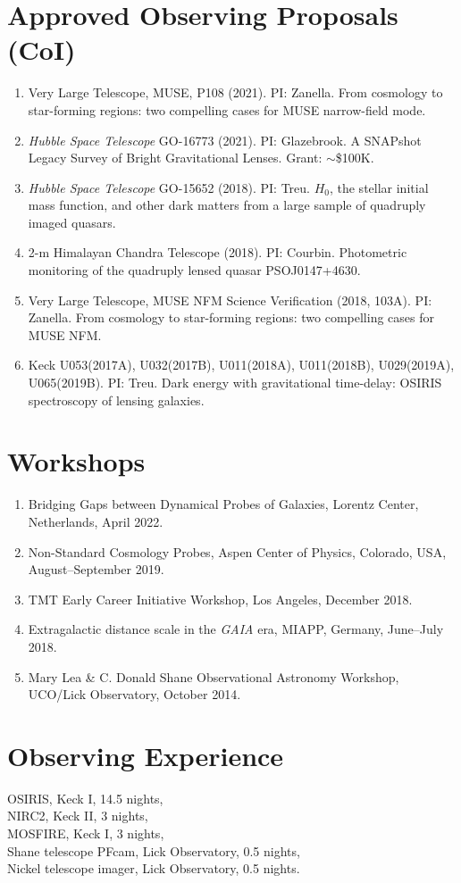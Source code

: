 \documentclass[margin, line]{res}
\begin{document}
\begin{resume}
\section{\sc Approved Observing Proposals (CoI)}
\begin{enumerate}
\item Very Large Telescope, MUSE, P108 (2021). PI: Zanella. From cosmology to star-forming regions: two compelling cases for MUSE narrow-field mode.
\item \textit{Hubble Space Telescope} GO-16773 (2021). PI: Glazebrook. A SNAPshot Legacy Survey of Bright Gravitational Lenses. Grant: $\sim$\$100K.
\item \textit{Hubble Space Telescope} GO-15652 (2018). PI: Treu. $H_0$, the stellar initial mass function, and other dark matters from a large sample of quadruply imaged quasars.
\item 2-m Himalayan Chandra Telescope (2018). PI: Courbin. Photometric monitoring of the quadruply lensed quasar PSOJ0147+4630.
\item Very Large Telescope, MUSE NFM Science Verification (2018, 103A). PI: Zanella. From cosmology to star-forming regions: two compelling cases for MUSE NFM.
\item Keck U053(2017A), U032(2017B), U011(2018A),  U011(2018B), U029(2019A), U065(2019B). PI: Treu. Dark energy with gravitational time-delay: OSIRIS spectroscopy of lensing galaxies.
\end{enumerate}


\section{\sc Workshops}
\begin{enumerate}
	\item Bridging Gaps between Dynamical Probes of Galaxies, Lorentz Center, Netherlands, April 2022.
	\item Non-Standard Cosmology Probes, Aspen Center of Physics, Colorado, USA, August--September 2019.
	\item TMT Early Career Initiative Workshop, Los Angeles, December 2018.
	\item Extragalactic distance scale in the \textit{GAIA} era, MIAPP, Germany, June--July 2018.
	\item Mary Lea \& C. Donald Shane Observational Astronomy Workshop, UCO/Lick Observatory, October 2014.
\end{enumerate}

\section{\sc Observing Experience}
OSIRIS, Keck I, 14.5 nights,\\
NIRC2, Keck II, 3 nights, \\
MOSFIRE, Keck I, 3 nights, \\
Shane telescope PFcam, Lick Observatory, 0.5 nights, \\
Nickel telescope imager, Lick Observatory, 0.5 nights.



\end{resume}
\end{document}
